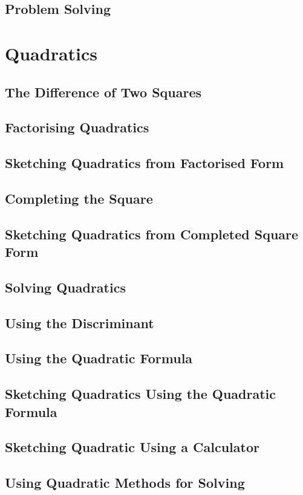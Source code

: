 \documentclass[../maths.tex]{subfiles}
\begin{document}
\subsection*{Problem Solving}
\section{Quadratics}
\subsection*{The Difference of Two Squares}
\subsection*{Factorising Quadratics}
\subsection*{Sketching Quadratics from Factorised Form}
\subsection*{Completing the Square}
\subsection*{Sketching Quadratics from Completed Square Form}
\subsection*{Solving Quadratics}
\subsection*{Using the Discriminant}
\subsection*{Using the Quadratic Formula}
\subsection*{Sketching Quadratics Using the Quadratic Formula}
\subsection*{Sketching Quadratic Using a Calculator}
\subsection*{Using Quadratic Methods for Solving}
\end{document}
